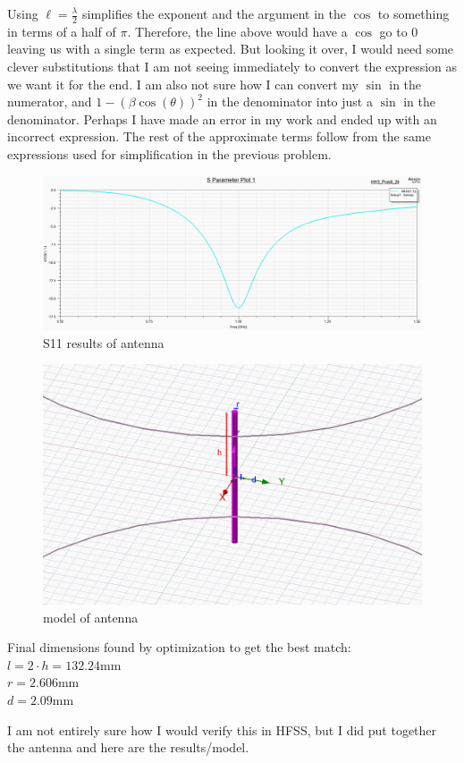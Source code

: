 \documentclass[12pt]{article}
\begin{document}
Using $\ell = \frac{\lambda}{2}$ simplifies the exponent and the argument in the $\cos$ to something in terms of a half of $\pi$. Therefore, the line above would have a $\cos$ go to $0$ leaving us with a single term as expected. But looking it over, I would need some clever substitutions that I am not seeing immediately to convert the expression as we want it for the end. I am also not sure how I can convert my $\sin$ in the numerator, and $1-(\beta\cos(\theta))^2$ in the denominator into just a $\sin$ in the denominator. Perhaps I have made an error in my work and ended up with an incorrect expression. The rest of the approximate terms follow from the same expressions used for simplification in the previous problem. 
\begin{center}
\begin{figure}[h]
    \centering
    \includegraphics[width=15cm]{./images/6-26.png}
    \caption{S11 results of antenna}
    \label{fig:S11}
  \end{figure}
\end{center}
\begin{center}
\begin{figure}[h]
    \centering
    \includegraphics[width=15cm]{./images/model.png}
    \caption{model of antenna}
    \label{fig:Model}
  \end{figure}
\end{center}
\begin{center}
Final dimensions found by optimization to get the best match:\\$l= 2 \cdot h =132.24$mm\\$r=2.606$mm\\$d=2.09$mm
\end{center}
I am not entirely sure how I would verify this in HFSS, but I did put together the antenna and here are the results/model. 
\newpage
\end{document}

